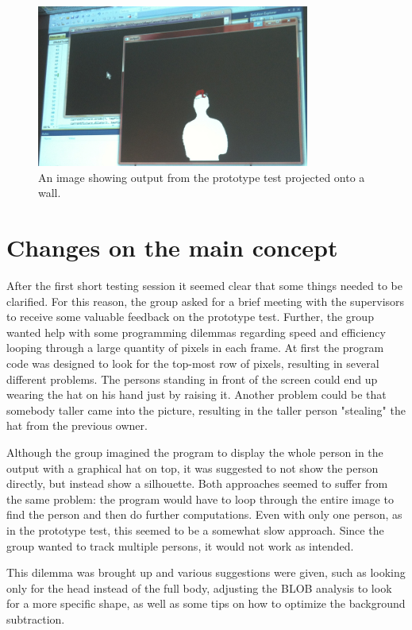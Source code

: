 \begin{figure}[htbp]
\centering
\includegraphics[width=0.80\textwidth]{Pictures/Test/MaxSubtracted.jpg}
\caption{An image showing output from the prototype test projected onto a wall.}
\label{fig:max_subtracted}
\end{figure}

\section{Changes on the main concept}
After the first short testing session it seemed clear that some things needed to be clarified. For this reason, the group asked for a brief meeting with the supervisors to receive some valuable feedback on the prototype test. Further, the group wanted help with some programming dilemmas regarding speed and efficiency looping through a large quantity of pixels in each frame. At first the program code was designed to look for the top-most row of pixels, resulting in several different problems. The persons standing in front of the screen could end up wearing the hat on his hand just by raising it. Another problem could be that somebody taller came into the picture, resulting in the taller person "stealing" the hat from the previous owner.

Although the group imagined the program to display the whole person in the output with a graphical hat on top, it was suggested to not show the person directly, but instead show a silhouette. Both approaches seemed to suffer from the same problem: the program would have to loop through the entire image to find the person and then do further computations. Even with only one person, as in the prototype test, this seemed to be a somewhat slow approach. Since the group wanted to track multiple persons, it would not work as intended.

This dilemma was brought up and various suggestions were given, such as looking only for the head instead of the full body, adjusting the BLOB analysis to look for a more specific shape, as well as some tips on how to optimize the background subtraction.

